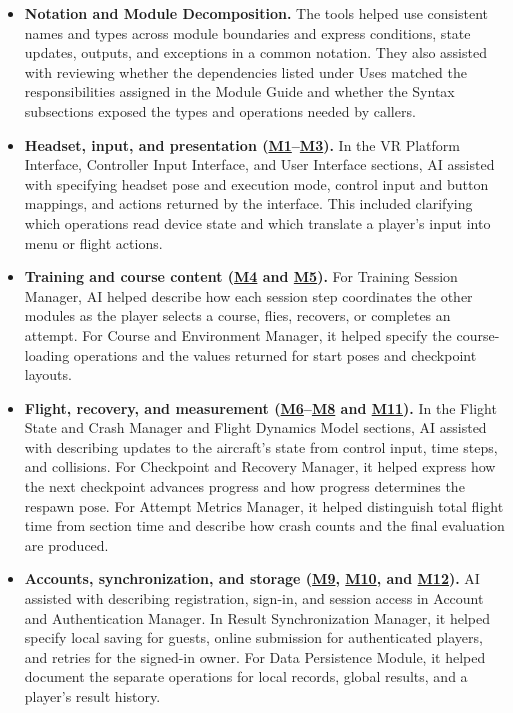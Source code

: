 \documentclass[12pt, titlepage]{article}
\newcommand{\Mref}[1]{\hyperref[sec:M#1]{M#1}}
\begin{document}
\begin{itemize}
\item \textbf{Notation and Module Decomposition.} The tools helped use
consistent names and types across module boundaries and express
conditions, state updates, outputs, and exceptions in a common notation.
They also assisted with reviewing whether the dependencies listed under
Uses matched the responsibilities assigned in the Module Guide and
whether the Syntax subsections exposed the types and operations needed
by callers.

\item \textbf{Headset, input, and presentation (\Mref{1}--\Mref{3}).}
In the VR Platform Interface, Controller Input Interface, and User
Interface sections, AI assisted with specifying headset pose and
execution mode, control input and button mappings, and actions returned
by the interface. This included clarifying which operations read device
state and which translate a player's input into menu or flight actions.

\item \textbf{Training and course content (\Mref{4} and \Mref{5}).}
For Training Session Manager, AI helped describe how each session step
coordinates the other modules as the player selects a course, flies,
recovers, or completes an attempt. For Course and Environment Manager,
it helped specify the course-loading operations and the values returned
for start poses and checkpoint layouts.

\item \textbf{Flight, recovery, and measurement
(\Mref{6}--\Mref{8} and \Mref{11}).}
In the Flight State and Crash Manager and Flight Dynamics Model sections,
AI assisted with describing updates to the aircraft's state from
control input, time steps, and collisions. For Checkpoint and Recovery
Manager, it helped express how the next checkpoint advances progress
and how progress determines the respawn pose. For Attempt Metrics Manager,
it helped distinguish total flight time from section time and describe
how crash counts and the final evaluation are produced.

\item \textbf{Accounts, synchronization, and storage
(\Mref{9}, \Mref{10}, and \Mref{12}).}
AI assisted with describing registration, sign-in, and session access
in Account and Authentication Manager. In Result Synchronization
Manager, it helped specify local saving for guests, online submission
for authenticated players, and retries for the signed-in owner. For
Data Persistence Module, it helped document the separate operations
for local records, global results, and a player's result history.


\end{itemize}
\end{document}
